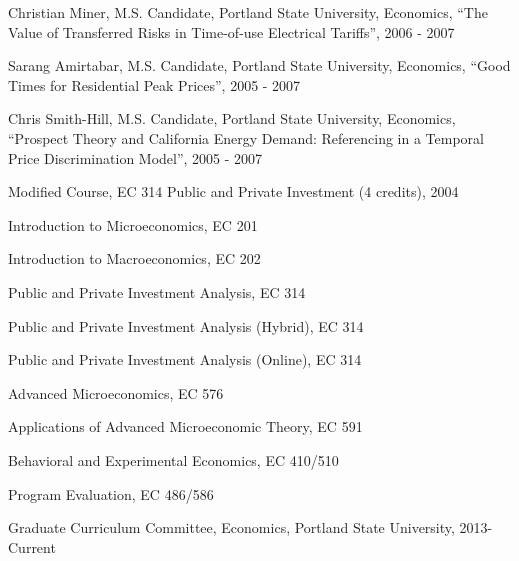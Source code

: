 \documentclass[Computer Science]{vita}
\begin{document}
\begin{vita}
\begin{Instructional Activities}
\begin{M.S. Project Adviser}
    \item Christian Miner, M.S. Candidate, Portland State University,
      Economics, ``The Value of Transferred Risks in Time-of-use
      Electrical Tariffs'', 2006 - 2007

    \item Sarang Amirtabar, M.S. Candidate, Portland State University,
      Economics, ``Good Times for Residential Peak Prices'', 2005 -
      2007

    \item Chris Smith-Hill, M.S. Candidate, Portland State University,
      Economics, ``Prospect Theory and California Energy Demand:
      Referencing in a Temporal Price Discrimination Model'', 2005 -
      2007
    \end{M.S. Project Adviser}

    \begin{Curriculum Development}
    \item Modified Course, EC 314 Public and Private Investment (4
      credits), 2004
    \end{Curriculum Development}

    \begin{Courses}
    \item Introduction to Microeconomics, EC 201
    \item Introduction to Macroeconomics, EC 202
    \item Public and Private Investment Analysis, EC 314
    \item Public and Private Investment Analysis (Hybrid), EC 314
    \item Public and Private Investment Analysis (Online), EC 314
				
    \item Advanced Microeconomics, EC 576
    \item Applications of Advanced Microeconomic Theory, EC 591

    \item Behavioral and Experimental Economics, EC 410/510
    \item Program Evaluation, EC 486/586
    \end{Courses}

      
  \end{Instructional Activities}
  \begin{Professional and Service Activities}

    \begin{University}
    
    \item Graduate Curriculum Committee, Economics, Portland State University, 2013- Current


\end{University}
\end{Professional and Service Activities}
\end{vita}
\end{document}
